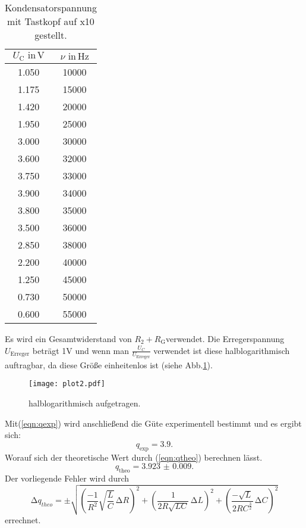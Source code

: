\begin{table}[h]
  \centering
  \label{tab:Uc}
  \begin{tabular}{ c c }
    \toprule
    {$U_{\text{C}} \,\, \text{in} \,\si{\volt}$}
   &{$\nu \,\, \text{in} \,\si{\hertz}$} \\

    \midrule
    1.050  & 10000 \\
    1.175  & 15000 \\
    1.420  & 20000 \\
    1.950  & 25000 \\
    3.000  & 30000 \\
    3.600  & 32000 \\
    3.750  & 33000 \\
    3.900  & 34000 \\
    3.800  & 35000 \\
    3.500  & 36000 \\
    2.850  & 38000 \\
    2.200  & 40000 \\
    1.250  & 45000 \\
    0.730  & 50000 \\
    0.600  & 55000 \\

    \bottomrule
  \end{tabular}
  \caption{Kondensatorspannung mit Tastkopf auf x10 gestellt.}
\end{table}

Es wird ein Gesamtwiderstand von $R_\text{2} + R_\text{G} $verwendet.
Die Erregerspannung $U_{\text{Erreger}}$ beträgt 1V und wenn man $\frac{U_{C}}{U_{\text{Erreger}}}$
verwendet ist diese halblogarithmisch auftragbar, da diese Größe einheitenlos ist (siehe Abb.\ref{fig:plot2}).

\begin{figure}
  \centering
  \texttt{[image: plot2.pdf]}
  \caption{halblogarithmisch aufgetragen.}
  \label{fig:plot2}
\end{figure}

Mit(\ref{eqn:qexp}) wird anschließend die Güte experimentell bestimmt und es ergibt sich:
\begin{equation*}
  q_{\text{exp}} = 3.9.
\end{equation*}
Worauf sich der theoretische Wert durch (\ref{eqn:qtheo}) berechnen lässt.
\begin{equation*}
  q_{\text{theo}} = \num{3.923(9)}.
\end{equation*}
Der vorliegende Fehler wird durch
\begin{equation*}
  \increment q_{theo} = \pm \sqrt{\left(\frac{-1}{R^2}\sqrt{\frac{L}{C}}\, \increment R \right)^2 +
  \left(\frac{1}{2R\sqrt{LC}}\, \increment L \right)^2 + \left(\frac{-\sqrt{L}}{2RC^{\frac{3}{2}}}\, \increment C \right)^2}
\end{equation*}
errechnet.


